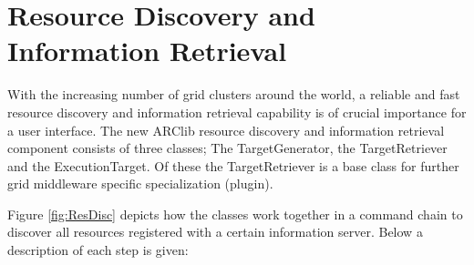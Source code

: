\documentclass{book}
\begin{document}
\section{Resource Discovery and Information Retrieval}
\label{sec:TargetDiscovery}
With the increasing number of grid clusters around the world, a reliable and fast resource discovery and 
information retrieval capability is of crucial importance for a user interface. The new ARClib resource 
discovery and information retrieval component consists of three classes; The TargetGenerator, the 
TargetRetriever and the ExecutionTarget. Of these the TargetRetriever is a base class for further grid 
middleware specific specialization (plugin).

Figure \ref{fig:ResDisc} depicts how the classes work together in a command chain to discover all resources 
registered with a certain information server. Below a description of each step is given:

\begin{figure}[ht]
\end{figure}
\end{document}
